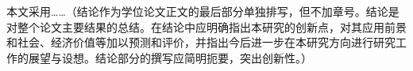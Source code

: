
\begin{conclusion}

本文采用……{\color{blue}（结论作为学位论文正文的最后部分单独排写，但不加章号。结论是对整个论文主要结果的总结。在结论中应明确指出本研究的创新点，对其应用前景和社会、经济价值等加以预测和评价，并指出今后进一步在本研究方向进行研究工作的展望与设想。结论部分的撰写应简明扼要，突出创新性。）}

\end{conclusion}
